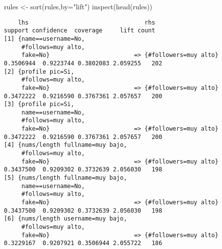 \documentclass[
  letterpaper,
  DIV=11,
  numbers=noendperiod]{scrreprt}
\newenvironment{Shaded}{\begin{snugshade}}{\end{snugshade}}
\newcommand{\AttributeTok}[1]{\textcolor[rgb]{0.40,0.45,0.13}{#1}}
\newcommand{\FunctionTok}[1]{\textcolor[rgb]{0.28,0.35,0.67}{#1}}
\newcommand{\NormalTok}[1]{\textcolor[rgb]{0.00,0.23,0.31}{#1}}
\newcommand{\OtherTok}[1]{\textcolor[rgb]{0.00,0.23,0.31}{#1}}
\newcommand{\StringTok}[1]{\textcolor[rgb]{0.13,0.47,0.30}{#1}}
\begin{document}
\begin{Shaded}
\begin{Highlighting}[]
\NormalTok{rules }\OtherTok{\textless{}{-}} \FunctionTok{sort}\NormalTok{(rules,}\AttributeTok{by=}\StringTok{"lift"}\NormalTok{)}
\FunctionTok{inspect}\NormalTok{(}\FunctionTok{head}\NormalTok{(rules)) }
\end{Highlighting}
\end{Shaded}

\begin{verbatim}
    lhs                                 rhs                     support confidence  coverage     lift count
[1] {name==username=No,                                                                                    
     #follows=muy alto,                                                                                    
     fake=No}                        => {#followers=muy alto} 0.3506944  0.9223744 0.3802083 2.059255   202
[2] {profile pic=Si,                                                                                       
     #follows=muy alto,                                                                                    
     fake=No}                        => {#followers=muy alto} 0.3472222  0.9216590 0.3767361 2.057657   200
[3] {profile pic=Si,                                                                                       
     name==username=No,                                                                                    
     #follows=muy alto,                                                                                    
     fake=No}                        => {#followers=muy alto} 0.3472222  0.9216590 0.3767361 2.057657   200
[4] {nums/length fullname=muy bajo,                                                                        
     #follows=muy alto,                                                                                    
     fake=No}                        => {#followers=muy alto} 0.3437500  0.9209302 0.3732639 2.056030   198
[5] {nums/length fullname=muy bajo,                                                                        
     name==username=No,                                                                                    
     #follows=muy alto,                                                                                    
     fake=No}                        => {#followers=muy alto} 0.3437500  0.9209302 0.3732639 2.056030   198
[6] {nums/length username=muy bajo,                                                                        
     #follows=muy alto,                                                                                    
     fake=No}                        => {#followers=muy alto} 0.3229167  0.9207921 0.3506944 2.055722   186
\end{verbatim}
\end{document}
